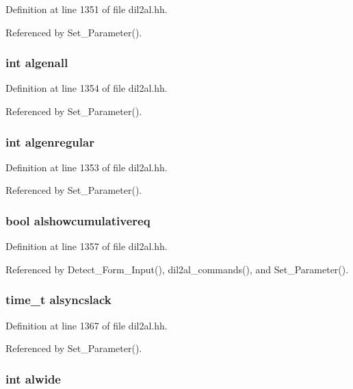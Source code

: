 Definition at line 1351 of file dil2al.hh.

Referenced by Set\_\-Parameter().
\subsubsection{\setlength{\rightskip}{0pt plus 5cm}int algenall}\label{dil2al_8hh_a160}




Definition at line 1354 of file dil2al.hh.

Referenced by Set\_\-Parameter().
\subsubsection{\setlength{\rightskip}{0pt plus 5cm}int algenregular}\label{dil2al_8hh_a159}




Definition at line 1353 of file dil2al.hh.

Referenced by Set\_\-Parameter().
\subsubsection{\setlength{\rightskip}{0pt plus 5cm}bool alshowcumulativereq}\label{dil2al_8hh_a163}




Definition at line 1357 of file dil2al.hh.

Referenced by Detect\_\-Form\_\-Input(), dil2al\_\-commands(), and Set\_\-Parameter().
\subsubsection{\setlength{\rightskip}{0pt plus 5cm}time\_\-t alsyncslack}\label{dil2al_8hh_a173}




Definition at line 1367 of file dil2al.hh.

Referenced by Set\_\-Parameter().
\subsubsection{\setlength{\rightskip}{0pt plus 5cm}int alwide}\label{dil2al_8hh_a158}




